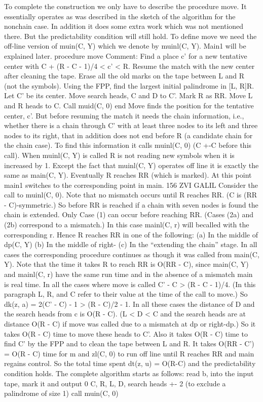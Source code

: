 \documentclass[11pt,a4paper]{report}
\begin{document}
To complete the construction we only have to describe the procedure move. It essentially
operates as was described in the sketch of the algorithm for the nonchain case. In addition
it does some extra work which was not mentioned there. But the predictability condition
will still hold. To define move we need the off-line version of muin(C, Y) which we denote
by muinl(C, Y). Main1 will be explained later.
procedure move
Comment: Find a place c’ for a new tentative center with
C + (R - C - 1)/4 < c’ < R. Resume the match with the new center
after cleaning the tape.
Erase all the old marks on the tape between L and R (not the symbols).
Using the FPP, find the largest initial palindrome in [L, R]R.
Let C’ be its center.
Move search heads, C and D to C’.
Mark R as RR.
Move L and R heads to C.
Call muid(C, 0)
end
Move finds the position for the tentative center, c’. But before resuming the match
it needs the chain information, i.e., whether there is a chain through C’ with at least three
nodes to its left and three nodes to its right, that in addition does not end before R
(a candidate chain for the chain case). To find this information it calls muinl(C, 0) (C +-C
before this call).
When muinl(C, Y) is called R is not reading new symbols when it is increased by 1.
Except the fact that muinl(C, Y) operates off line it is exactly the same as main(C, Y).
Eventually R reaches RR (which is marked). At this point main1 switches to the corresponding point in main. 
156 ZVI GALIL
Consider the call to muinl(C, 0). Note that no mismatch occurs until R reaches RR.
(C is (RR - C)-symmetric.) So before RR is reached if a chain with seven nodes is found
the chain is extended. Only Case (1) can occur before reaching RR. (Cases (2a) and (2b)
correspond to a mismatch.) In this case mainl(C, r) will becalled with the corresponding r.
Hence R reaches RR in one of the following:
(a) In the middle of dp(C, Y)
(b) In the middle of right-
(c) In the “extending the chain” stage.
In all cases the corresponding procedure continues as though it was called from
main(C, Y). Note that the time it takes R to reach RR is O(RR - C), since main(C, Y)
and mainl(C, r) have the same run time and in the absence of a mismatch main is real time.
In all the cases where move is called C’ - C > (R - C - 1)/4. (In this paragraph L,
R, and C refer to their value at the time of the call to move.) So dk(z, a) = 2(C’ - C) -
1 > (R - C)/2 - 1. In all these cases the distance of D and the search heads from c is
O(R - C). (L < D < C and the search heads are at distance O(R - C) if move was
called due to a mismatch at dp or right-dp.) So it takes O(R - C) time to move these
heads to C’. Also it takes O(R - C) time to find C’ by the FPP and to clean the tape
between L and R. It takes O(RR - C’) = O(R - C) time for m and zl(C, 0) to run off line
until R reaches RR and main regains control. So the total time spent dt(z, u) = O(R-C)
and the predictability condition holds.
The complete algorithm starts as follows:
read b, into the input tape, mark it and output 0
C, R, L, D, search heads +- 2 (to exclude a palindrome of size 1)
call muin(C, 0)
\end{document}
